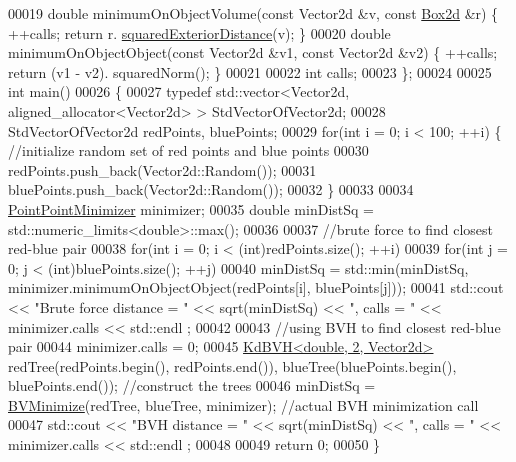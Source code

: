 \begin{DoxyCode}
00019   \textcolor{keywordtype}{double} minimumOnObjectVolume(\textcolor{keyword}{const} Vector2d &v, \textcolor{keyword}{const} \hyperlink{group___geometry___module_class_eigen_1_1_aligned_box}{Box2d} &r) \{ ++calls; \textcolor{keywordflow}{return} r.
      \hyperlink{group___geometry___module_aa6d9ffc81bd77da631fef6559f45cf13}{squaredExteriorDistance}(v); \}
00020   \textcolor{keywordtype}{double} minimumOnObjectObject(\textcolor{keyword}{const} Vector2d &v1, \textcolor{keyword}{const} Vector2d &v2) \{ ++calls; \textcolor{keywordflow}{return} (v1 - v2).
      squaredNorm(); \}
00021 
00022   \textcolor{keywordtype}{int} calls;
00023 \};
00024 
00025 \textcolor{keywordtype}{int} main()
00026 \{
00027   \textcolor{keyword}{typedef} std::vector<Vector2d, aligned\_allocator<Vector2d> > StdVectorOfVector2d;
00028   StdVectorOfVector2d redPoints, bluePoints;
00029   \textcolor{keywordflow}{for}(\textcolor{keywordtype}{int} i = 0; i < 100; ++i) \{ \textcolor{comment}{//initialize random set of red points and blue points}
00030     redPoints.push\_back(Vector2d::Random());
00031     bluePoints.push\_back(Vector2d::Random());
00032   \}
00033 
00034   \hyperlink{struct_point_point_minimizer}{PointPointMinimizer} minimizer;
00035   \textcolor{keywordtype}{double} minDistSq = std::numeric\_limits<double>::max();
00036 
00037   \textcolor{comment}{//brute force to find closest red-blue pair}
00038   \textcolor{keywordflow}{for}(\textcolor{keywordtype}{int} i = 0; i < (int)redPoints.size(); ++i)
00039     \textcolor{keywordflow}{for}(\textcolor{keywordtype}{int} j = 0; j < (int)bluePoints.size(); ++j)
00040       minDistSq = std::min(minDistSq, minimizer.minimumOnObjectObject(redPoints[i], bluePoints[j]));
00041   std::cout << \textcolor{stringliteral}{"Brute force distance = "} << sqrt(minDistSq) << \textcolor{stringliteral}{", calls = "} << minimizer.calls << std::endl
      ;
00042 
00043   \textcolor{comment}{//using BVH to find closest red-blue pair}
00044   minimizer.calls = 0;
00045   \hyperlink{class_eigen_1_1_kd_b_v_h}{KdBVH<double, 2, Vector2d>} redTree(redPoints.begin(), redPoints.end()), 
      blueTree(bluePoints.begin(), bluePoints.end()); \textcolor{comment}{//construct the trees}
00046   minDistSq = \hyperlink{namespace_eigen_adcbe73ac1482eacab0e18ee32c25508e}{BVMinimize}(redTree, blueTree, minimizer); \textcolor{comment}{//actual BVH minimization call}
00047   std::cout << \textcolor{stringliteral}{"BVH distance         = "} << sqrt(minDistSq) << \textcolor{stringliteral}{", calls = "} << minimizer.calls << std::endl
      ;
00048 
00049   \textcolor{keywordflow}{return} 0;
00050 \}
\end{DoxyCode}
